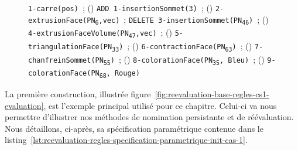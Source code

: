 \begin{figure}
{		\texttt{1-carre(pos)}~;
		()
		\texttt{ADD~1-\allowbreak{}insertion\-Sommet(3)}~;
		()
		\texttt{2-\allowbreak{}extrusion\-Face(PN\textsubscript{6},vec)}~;
		\texttt{DELETE~3-\allowbreak{}insertion\-Sommet(PN\textsubscript{46})}~;
		()
		\texttt{4-\allowbreak{}extrus\-ion\-Face\-Volume(PN\textsubscript{47},vec)}~;
		()
		\texttt{5-\allowbreak{}tri\-an\-gu\-la\-t\-i\-on\-Face(PN\textsubscript{33})}~;
		()
		\texttt{6-\allowbreak{}contraction\-Face(PN\textsubscript{63})}~;
		()
		\texttt{7-\allowbreak{}chanfrein\-Sommet(PN\textsubscript{55})}~;
		()
		\texttt{8-\allowbreak{}co\-lo\-ra\-t\-i\-on\-Face(PN\textsubscript{35},
			Bleu)}~;
		()
		\texttt{9-\allowbreak{}co\-lo\-ra\-t\-i\-on\-Face(PN\textsubscript{68},
			Rouge)}}
	\label{fig:reevaluation-base-regles-cs1-reevaluation}
\end{figure}

La première construction, illustrée
figure~\ref{fig:reevaluation-base-regles-cs1-evaluation}, est l'exemple principal
utilisé pour ce chapitre. %
Celui-ci va nous permettre d'illustrer nos méthodes de nomination persistante
et de réévaluation. %
Nous détaillons, ci-après, sa spécification paramétrique contenue dans le
listing~\ref{lst:reevaluation-regles-specification-parametrique-init-cas-1}. %

